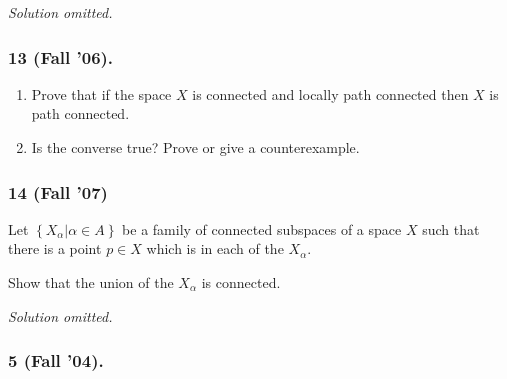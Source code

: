
\emph{Solution omitted.}

\hypertarget{fall-06.-1}{%
\subsubsection{13 (Fall '06).}\label{fall-06.-1}}

\begin{problem}[Fall 2006, 13]

\envlist

\begin{enumerate}
\def\labelenumi{\alph{enumi}.}
\item
  Prove that if the space \(X\) is connected and locally path connected
  then \(X\) is path connected.
\item
  Is the converse true? Prove or give a counterexample.
\end{enumerate}

\end{problem}

\hypertarget{fall-07}{%
\subsubsection{14 (Fall '07)}\label{fall-07}}

\begin{problem}[?]

Let \(\left\{{X_\alpha \mathrel{\Big|}\alpha \in A}\right\}\) be a
family of connected subspaces of a space \(X\) such that there is a
point \(p \in X\) which is in each of the \(X_\alpha\).

Show that the union of the \(X_\alpha\) is connected.

\end{problem}


\emph{Solution omitted.}

\hypertarget{fall-04.}{%
\subsubsection{5 (Fall '04).}\label{fall-04.}}

